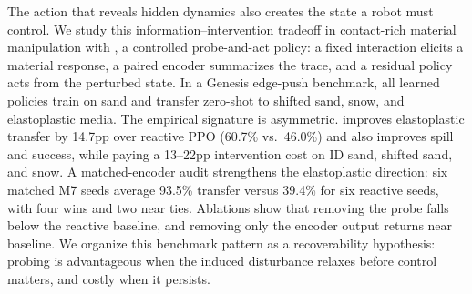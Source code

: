 The action that reveals hidden dynamics also creates the state a robot must control. We study this information--intervention tradeoff in contact-rich material manipulation with \PTA{}, a controlled probe-and-act policy: a fixed interaction elicits a material response, a paired encoder summarizes the trace, and a residual policy acts from the perturbed state. In a Genesis edge-push benchmark, all learned policies train on sand and transfer zero-shot to shifted sand, snow, and elastoplastic media. The empirical signature is asymmetric. \PTA{} improves elastoplastic transfer by 14.7pp over reactive PPO (60.7\% vs.\ 46.0\%) and also improves spill and success, while paying a 13--22pp intervention cost on ID sand, shifted sand, and snow. A matched-encoder audit strengthens the elastoplastic direction: six matched M7 seeds average 93.5\% transfer versus 39.4\% for six reactive seeds, with four wins and two near ties. Ablations show that removing the probe falls below the reactive baseline, and removing only the encoder output returns near baseline. We organize this benchmark pattern as a recoverability hypothesis: probing is advantageous when the induced disturbance relaxes before control matters, and costly when it persists.
